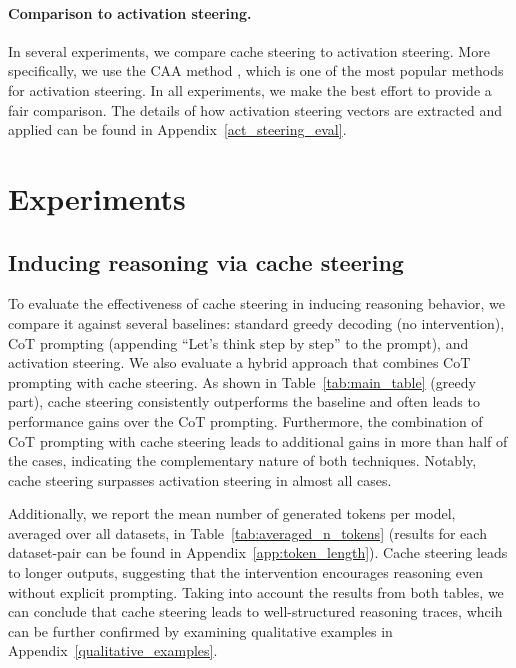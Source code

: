 \documentclass{article} %
\begin{document}
\paragraph{Comparison to activation steering.}
In several experiments, we compare cache steering to activation steering. More specifically, we use the CAA method \citep{panickssery2023steering}, which is one of the most popular methods for activation steering. In all experiments, we make the best effort to provide a fair comparison. The details of how activation steering vectors are extracted and applied can be found in Appendix~\ref{act_steering_eval}.


\section{Experiments}

\subsection{Inducing reasoning via cache steering}

To evaluate the effectiveness of cache steering in inducing reasoning behavior, we compare it against several baselines: standard greedy decoding (no intervention), CoT prompting (appending “Let’s think step by step” to the prompt), and activation steering. We also evaluate a hybrid approach that combines CoT prompting with cache steering. As shown in Table~\ref{tab:main_table} (greedy part), cache steering consistently outperforms the baseline and often leads to performance gains over the CoT prompting. Furthermore, the combination of CoT prompting with cache steering leads to additional gains in more than half of the cases, indicating the complementary nature of both techniques. Notably, cache steering surpasses activation steering in almost all cases.

Additionally, we report the mean number of generated tokens per model, averaged over all datasets, in Table~\ref{tab:averaged_n_tokens} (results for each dataset-pair can be found in Appendix~\ref{app:token_length}). 
Cache steering leads to longer outputs, suggesting that the intervention encourages reasoning even without explicit prompting.
Taking into account the results from both tables, we can conclude that cache steering leads to well-structured reasoning traces, whcih can be further confirmed by examining qualitative examples in Appendix~\ref{qualitative_examples}.
\end{document}
